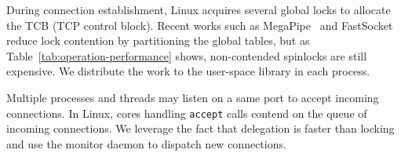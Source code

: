 During connection establishment, Linux acquires several global locks to allocate the TCB (TCP control block).
Recent works such as MegaPipe~\cite{han2012megapipe} and FastSocket~\cite{lin2016scalable} reduce lock contention by partitioning the global tables, but as Table~\ref{tab:operation-performance} shows, non-contended spinlocks are still expensive.
We distribute the work to the user-space library \libipc{} in each process.

Multiple processes and threads may listen on a same port to accept incoming connections.
In Linux, cores handling \texttt{accept} calls contend on the queue of incoming connections.
We leverage the fact that delegation is faster than locking~\cite{roghanchi2017ffwd} and use the monitor daemon to dispatch new connections.







